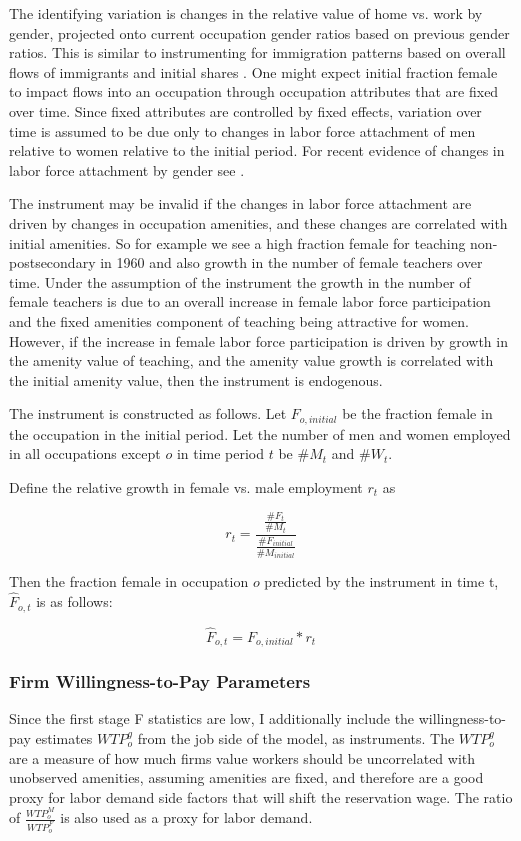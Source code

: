 \documentclass[12pt]{article}
\begin{document}
The identifying variation is changes in the relative value of home vs. work by gender, projected onto current occupation gender ratios based on previous gender ratios. This is similar to instrumenting for immigration patterns based on overall flows of immigrants and initial shares \cite{Altonji1991a}. One might expect initial fraction female to impact flows into an occupation through occupation attributes that are fixed over time. Since fixed attributes are controlled by fixed effects, variation over time is assumed to be due only to changes in labor force attachment of men relative to women relative to the initial period. For recent evidence of changes in labor force attachment by gender see . 

The instrument may be invalid if the changes in labor force attachment are driven by changes in occupation amenities, and these changes are correlated with initial amenities. So for example we see a high fraction female for teaching non-postsecondary in 1960 and also growth in the number of female teachers over time. Under the assumption of the instrument the growth in the number of female teachers is due to an overall increase in female labor force participation and the fixed amenities component of teaching being attractive for women. However, if the increase in female labor force participation is driven by growth in the amenity value of teaching, and the amenity value growth is correlated with the initial amenity value, then the instrument is endogenous.

The instrument is constructed as follows. Let $F_{o,initial}$ be the fraction female in the occupation in the initial period. Let the number of men and women employed in all occupations except $o$ in time period $t$ be $\#M_t$ and $\#W_t$.

Define the relative growth in female vs. male employment $r_t$ as

$$ r_t = \frac{ \frac{\#F_t}{\#M_t} }{ \frac{\#F_{initial}}{\#M_{initial}} }$$

Then the fraction female in occupation $o$ predicted by the instrument in time t, $\hat{F}_{o,t}$ is as follows:

$$\hat{F}_{o,t} = F_{o,initial} * r_t $$

\subsubsection{Firm Willingness-to-Pay Parameters}
Since the first stage F statistics are low, I additionally include the willingness-to-pay estimates $WTP^g_o$ from the job side of the model, as instruments. The $WTP^g_o$ are a measure of how much firms value workers should be uncorrelated with unobserved amenities, assuming amenities are fixed, and therefore are a good proxy for labor demand side factors that will shift the reservation wage. The ratio of $\frac{WTP^M_o}{WTP^F_o}$ is also used as a proxy for labor demand.
\end{document}
